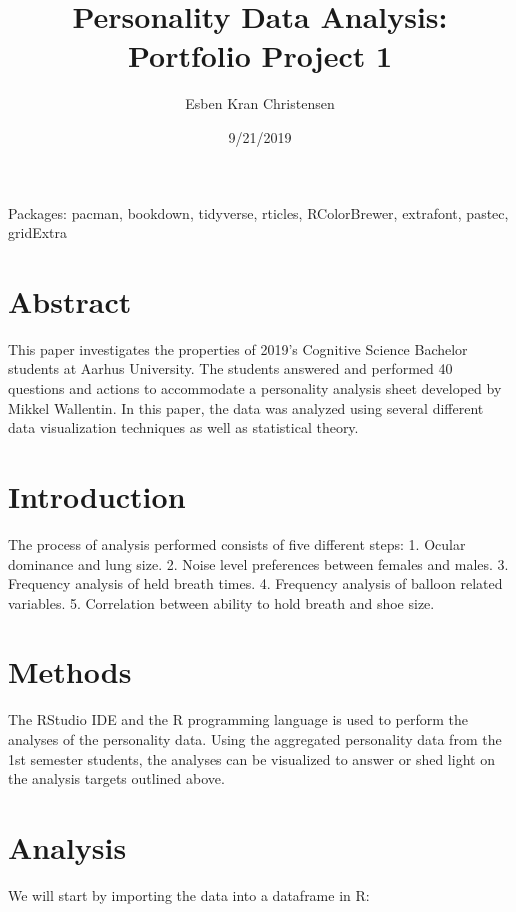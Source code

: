 \documentclass[]{article}
\title{Personality Data Analysis: Portfolio Project 1}
\author{Esben Kran Christensen}
\date{9/21/2019}
\begin{document}
\maketitle

{
\setcounter{tocdepth}{2}
\tableofcontents
}
Packages: pacman, bookdown, tidyverse, rticles, RColorBrewer, extrafont, pastec, gridExtra

\hypertarget{abstract}{%
\section{Abstract}\label{abstract}}

This paper investigates the properties of 2019's Cognitive Science Bachelor students at Aarhus University. The students answered and performed 40 questions and actions to accommodate a personality analysis sheet developed by Mikkel Wallentin. In this paper, the data was analyzed using several different data visualization techniques as well as statistical theory.

\hypertarget{introduction}{%
\section{Introduction}\label{introduction}}

The process of analysis performed consists of five different steps:
1. Ocular dominance and lung size.
2. Noise level preferences between females and males.
3. Frequency analysis of held breath times.
4. Frequency analysis of balloon related variables.
5. Correlation between ability to hold breath and shoe size.

\hypertarget{methods}{%
\section{Methods}\label{methods}}

The RStudio IDE and the R programming language is used to perform the analyses of the personality data. Using the aggregated personality data from the 1st semester students, the analyses can be visualized to answer or shed light on the analysis targets outlined above.

\hypertarget{analysis}{%
\section{Analysis}\label{analysis}}

We will start by importing the data into a dataframe in R:
\end{document}

